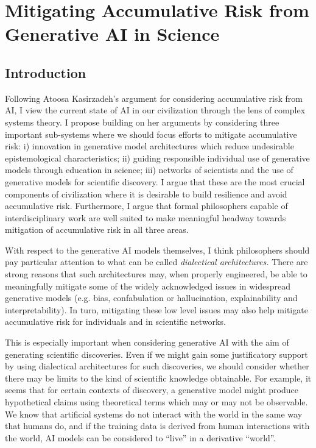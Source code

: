 \documentclass[11pt, oneside]{article}   	%
\begin{document}
\section{Mitigating Accumulative Risk from Generative AI in Science}


\subsection{Introduction}

Following Atoosa Kasirzadeh’s argument for considering accumulative risk from AI, I view the current state of AI in our civilization through the lens of complex systems theory. I propose building on her arguments by considering three important sub-systems where we should focus efforts to mitigate accumulative risk: i) innovation in generative model architectures which reduce undesirable epistemological characteristics; ii) guiding responsible individual use of generative models through education in science; iii) networks of scientists and the use of generative models for scientific discovery. I argue that these are the most crucial components of civilization where it is desirable to build resilience and avoid accumulative risk.  Furthermore, I argue that formal philosophers capable of interdisciplinary work are well suited to make meaningful headway towards mitigation of accumulative risk in all three areas.



With respect to the generative AI models themselves, I think philosophers should pay particular attention to what can be called \emph{dialectical architectures.}  There are strong reasons that such architectures may, when properly engineered, be able to meaningfully mitigate some of the widely acknowledged issues in widespread generative models (e.g. bias, confabulation or hallucination, explainability and interpretability). In turn, mitigating these low level issues may also help mitigate accumulative risk for individuals and in scientific networks.  


This is especially important when considering generative AI with the aim of generating scientific discoveries.  Even if we might gain some justificatory support by using dialectical architectures for such discoveries, we should consider whether there may be limits to the kind of scientific knowledge obtainable.  For example, it seems that for certain contexts of discovery, a generative model might produce hypothetical claims using theoretical terms which may or may not be observable.  We know that artificial systems do not interact with the world in the same way that humans do, and if the training data is derived from human interactions with the world, AI models can be considered to ``live'' in a derivative ``world''.
\end{document}

